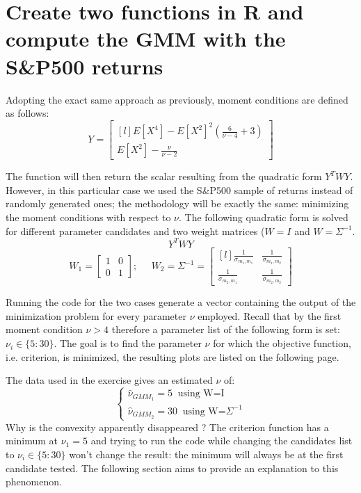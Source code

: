 \newpage
\section{Create two functions in R and compute the GMM with the S\&P500 returns}

Adopting the exact same approach as previously, moment conditions are defined as follows:
\begin{equation*}
    Y=    
    \begin{bmatrix}[l]
    E[X^4]-E[X^2]^2(\frac{6}{\nu-4}+3)  \\
    E[X^2]-\frac{\nu}{\nu-2}
    \end{bmatrix}
\end{equation*}

The function will then return the scalar resulting from the quadratic form $Y^TWY$. However, in this particular case we used the S\&P500 sample of returns instead of randomly generated ones; the methodology will be exactly the same: minimizing the moment conditions with respect to $\nu$. The following quadratic form is solved for different parameter candidates and two weight matrices ($W=I$ and $W=\Sigma^{-1}$.
\begin{equation*}
    Y^TWY
\end{equation*}
\begin{equation*}
    W_1=
    \begin{bmatrix}
        1   &0 \\
        0   &1
    \end{bmatrix};\;\;\;\;\;
    W_2=\Sigma^{-1}=
    \begin{bmatrix}[l]
        \frac{1}{\sigma_{m_1,m_1}}    &\frac{1}{\sigma_{m_1,m_2}} \\
        \frac{1}{\sigma_{m_2,m_1}}    &\frac{1}{\sigma_{m_2,m_2}}
    \end{bmatrix}
\end{equation*}

Running the code for the two cases generate a vector containing the output of the minimization problem for every parameter $\nu$ employed. Recall that by the first moment condition $\nu>4$ therefore a parameter list of the following form is set: $\nu_i \in \{5:30\}$. The goal is to find the parameter $\nu$ for which the objective function, i.e. criterion, is minimized, the resulting plots are listed on the following page.
\bigskip\par
The data used in the exercise gives an estimated $\nu$ of:
\begin{equation*}
    \begin{cases}
    \widehat{\nu}_{GMM_{1}}=5 \;\;\text{using W=I}\\
    \widehat{\nu}_{GMM_{2}}=30 \;\;\text{using W=}\Sigma^{-1}
\end{cases}
\end{equation*}
Why is the convexity apparently disappeared ? The criterion function has a minimum at $\nu_1=5$ and trying to run the code while changing the candidates list to $\nu_i \in \{5:30\}$ won't change the result: the minimum will always be at the first candidate tested. The following section aims to provide an explanation to this phenomenon.

